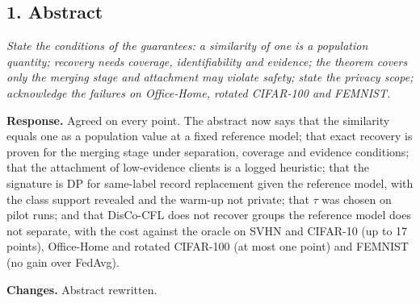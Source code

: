 \documentclass[11pt]{article}
\newenvironment{revcomment}{\par\medskip\noindent\begin{minipage}{\linewidth}\color{blue!45!black}\itshape}{\end{minipage}\par\smallskip}
\newcommand{\resp}{\par\noindent\textbf{Response.} }
\newcommand{\chg}{\par\noindent\textbf{Changes.} }
\begin{document}
\subsection*{1. Abstract}
\begin{revcomment}
State the conditions of the guarantees: a similarity of one is a population quantity; recovery needs coverage, identifiability and evidence; the theorem covers only the merging stage and attachment may violate safety; state the privacy scope; acknowledge the failures on Office-Home, rotated CIFAR-100 and FEMNIST.
\end{revcomment}
\resp Agreed on every point. The abstract now says that the similarity equals one as a population value at a fixed reference model; that exact recovery is proven for the merging stage under separation, coverage and evidence conditions; that the attachment of low-evidence clients is a logged heuristic; that the signature is DP for same-label record replacement given the reference model, with the class support revealed and the warm-up not private; that $\tau$ was chosen on pilot runs; and that DisCo-CFL does not recover groups the reference model does not separate, with the cost against the oracle on SVHN and CIFAR-10 (up to 17 points), Office-Home and rotated CIFAR-100 (at most one point) and FEMNIST (no gain over FedAvg).
\chg Abstract rewritten.
\end{document}
